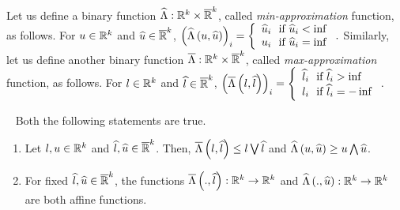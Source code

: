 Let us define a binary function
$\widehat{\Lambda}:\mathbb{R}^k\times\mathbb{\overline{R}}^k$,
called \emph{min-approximation} function, as follows.  For
$u\in\mathbb{R}^k$ and $\widehat{u}\in\mathbb{\overline{R}}^k$,
$\left(\widehat{\Lambda}\left(u,\widehat{u}\right)\right)_i = \left\{
\begin{array}{l}
\widehat{u}_i~~\text{if}~\widehat{u}_i<\inf\\
u_i~~\text{if}~\widehat{u}_i=\inf
\end{array}
\right..$
Similarly, let us define another binary function       
$\overline{\Lambda}:\mathbb{R}^k\times\mathbb{\overline{R}}^k$,
called \emph{max-approximation} function, as follows.  For
$l\in\mathbb{R}^k$ and $\widehat{l}\in\mathbb{\overline{R}}^k$,
$\left(\overline{\Lambda}\left(l,\widehat{l}\right)\right)_i = \left\{
\begin{array}{l}
\widehat{l}_i~~\text{if}~\widehat{l}_i>\inf\\
l_i~~\text{if}~\widehat{l}_i=-\inf
\end{array}
\right..$
%
\begin{lemma}~\label{lem:min-max-approx}
Both the following statements are true.
\begin{enumerate}
\item Let $l,u\in\mathbb{R}^k$ and $\widehat{l},\widehat{u}\in\mathbb{\overline{R}}^k$.
  Then, $\overline{\Lambda}\left(l,\widehat{l}\right)\leq l\bigvee\widehat{l}$ and
  $\widehat{\Lambda}\left(u,\widehat{u}\right)\geq u\bigwedge\widehat{u}$.
\item For fixed $\widehat{l},\widehat{u}\in\mathbb{\overline{R}}^k$, the functions
  $\overline{\Lambda}\left(.,\widehat{l}\right):\mathbb{R}^k\rightarrow\mathbb{R}^k$ and
  $\widehat{\Lambda}\left(.,\widehat{u}\right):\mathbb{R}^k\rightarrow\mathbb{R}^k$ are both affine functions.
\end{enumerate}
\end{lemma}





